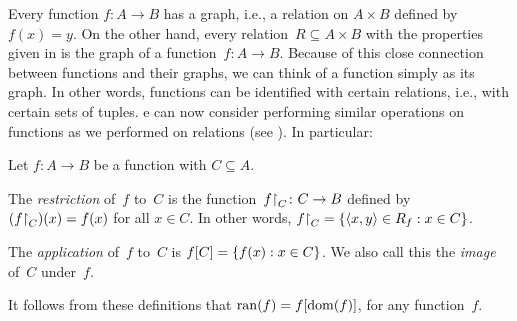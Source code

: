 \documentclass[../../../include/open-logic-section]{subfiles}
\begin{document}
\begin{explain}
Every function $f\colon A \to B$ has a graph, i.e., a relation on $A
\times B$ defined by $f(x) = y$. On the other hand, every relation~$R
\subseteq A \times B$ with the properties given in
 is the graph of a function~$f \colon A \to
B$. Because of this close connection between functions and their
graphs, we can think of a function simply as its graph. In other
words, functions can be identified with certain relations, i.e., with
certain sets of tuples. e can now consider performing similar operations on
functions as we performed on relations (see
). In particular:
\end{explain}

\begin{defn}
Let $f \colon A \to B$ be a function with $C\subseteq A$.

The \emph{restriction} of~$f$ to~$C$ is the
function~$f\mathord{\restriction}_{C}\colon C \to B$ defined by
$(f\mathord{\restriction}_{C})(x) = f(x)$ for all $x \in C$. In other
words, $f\mathord{\restriction}_{C} = \{ \langle x, y \rangle \in R_f : x \in
C \}$.

The \emph{application} of~$f$ to~$C$ is $f[C] =
\{ f(x) : x \in C \}$. We also call this the \emph{image} of~$C$
under~$f$.
\end{defn}

\begin{explain}
It follows from these definitions that $\mathrm{ran}(f) =
f[\mathrm{dom}(f)]$, for any function~$f$.
\end{explain}
\end{document}
